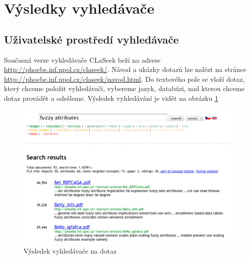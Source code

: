 \documentclass{article}
\newcommand{\name}{CLaSeek}
\newcommand{\nameurl}{\url{http://phoebe.inf.upol.cz/claseek/}}
\newcommand{\ssection}[1]{\subsection{#1}}
\newcommand{\sssection}[1]{\subsubsection{#1}}
\begin{document}
\newpage
\section{Výsledky vyhledávače}

\ssection{Uživatelské prostředí vyhledávače}
Současná verze vyhledávače \name{} beží na adrese \nameurl. Návod a ukázky dotazů lze nalézt na stránce \url{http://phoebe.inf.upol.cz/claseek/navod.html}. Do textového pole se vloží dotaz, který chceme položit vyhledávači, vybereme jazyk, databázi, nad kterou chceme dotaz provádět a odešleme. Výsledek vyhledávání je vidět na obrázku \ref{fig.gui.result1}


\begin{figure}
  \centering
  \includegraphics[width=14cm]{obrazky/gui-result1.pdf}
  \caption{Výsledek vyhledávače na dotaz }
  \label{fig.gui.result1}
\end{figure}


\end{document}
